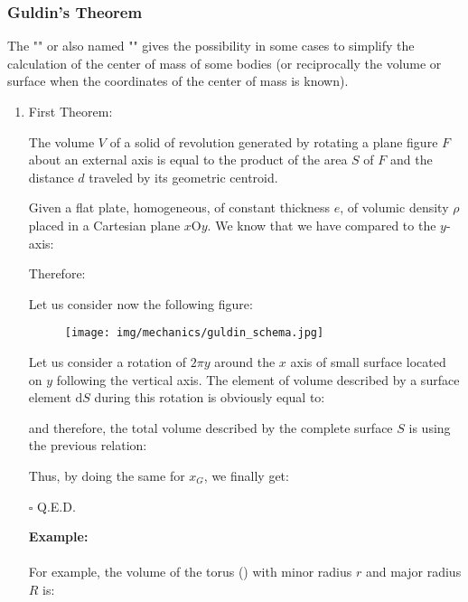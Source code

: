 	\pagebreak 
	\subsubsection{Guldin's Theorem}
	The "" or also named "" gives the possibility in some cases to simplify the calculation of the center of mass of some bodies (or reciprocally the volume or surface when the coordinates of the center of mass is known).

	\begin{enumerate}
		\item First Theorem:
		\begin{theorem}
		The volume $V$ of a solid of revolution generated by rotating a plane figure $F$ about an external axis is equal to the product of the area $S$ of $F$ and the distance $d$ traveled by its geometric centroid.
		\end{theorem}
		\begin{dem}
		Given a flat plate, homogeneous, of constant thickness $e$, of volumic density $\rho$ placed in a Cartesian plane $x$O$y$. We know that we have compared to the $y$-axis:
		
		
		Therefore:
		
		
		Let us consider now the following figure:
		\begin{figure}[H]
			\centering
			\texttt{[image: img/mechanics/guldin\_schema.jpg]}
		\end{figure}
		Let us consider a rotation of $2\pi y$ around the $x$ axis of small surface located on $y$ following the vertical axis. The element of volume described by a surface element $\mathrm{d}S$ during this rotation is obviously equal to:
		
		and therefore, the total volume described by the complete surface $S$ is using the previous relation:
		
		Thus, by doing the same for $x_G$, we finally get:
		
		\begin{flushright}
			$\square$  Q.E.D.
		\end{flushright}
		\end{dem}
		\begin{tcolorbox}[colframe=black,colback=white,sharp corners]
		\textbf{{\Large {}}Example:}\\\\
		For example, the volume of the torus () with minor radius $r$ and major radius $R$ is:
		

\end{tcolorbox}
\end{enumerate}

